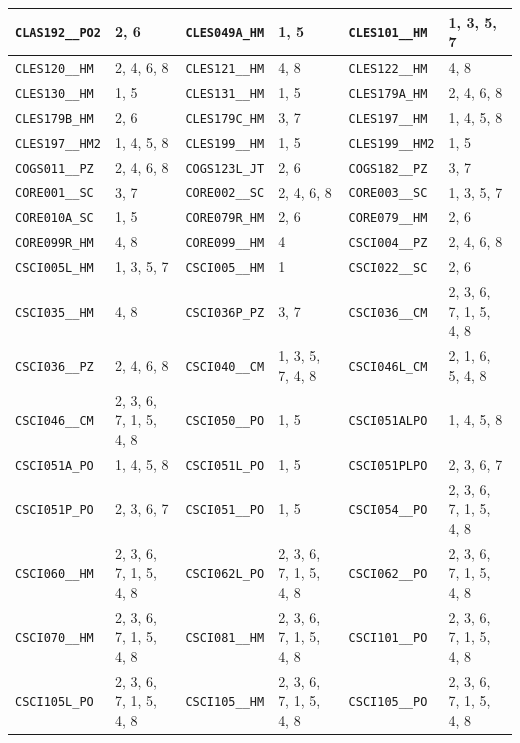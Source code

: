\begin{longtable}{|l|l||l|l||l|l|}
    \verb|CLAS192__PO2| & 2, 6 & \verb|CLES049A_HM| & 1, 5 & \verb|CLES101__HM| & 1, 3, 5, 7\\\hline
    \verb|CLES120__HM| & 2, 4, 6, 8 & \verb|CLES121__HM| & 4, 8 & \verb|CLES122__HM| & 4, 8\\\hline
    \verb|CLES130__HM| & 1, 5 & \verb|CLES131__HM| & 1, 5 & \verb|CLES179A_HM| & 2, 4, 6, 8\\\hline
    \verb|CLES179B_HM| & 2, 6 & \verb|CLES179C_HM| & 3, 7 & \verb|CLES197__HM| & 1, 4, 5, 8\\\hline
    \verb|CLES197__HM2| & 1, 4, 5, 8 & \verb|CLES199__HM| & 1, 5 & \verb|CLES199__HM2| & 1, 5\\\hline
    \verb|COGS011__PZ| & 2, 4, 6, 8 & \verb|COGS123L_JT| & 2, 6 & \verb|COGS182__PZ| & 3, 7\\\hline
    \verb|CORE001__SC| & 3, 7 & \verb|CORE002__SC| & 2, 4, 6, 8 & \verb|CORE003__SC| & 1, 3, 5, 7\\\hline
    \verb|CORE010A_SC| & 1, 5 & \verb|CORE079R_HM| & 2, 6 & \verb|CORE079__HM| & 2, 6\\\hline
    \verb|CORE099R_HM| & 4, 8 & \verb|CORE099__HM| & 4 & \verb|CSCI004__PZ| & 2, 4, 6, 8\\\hline
    \verb|CSCI005L_HM| & 1, 3, 5, 7 & \verb|CSCI005__HM| & 1 & \verb|CSCI022__SC| & 2, 6\\\hline
    \verb|CSCI035__HM| & 4, 8 & \verb|CSCI036P_PZ| & 3, 7 & \verb|CSCI036__CM| & 2, 3, 6, 7, 1, 5, 4, 8\\\hline
    \verb|CSCI036__PZ| & 2, 4, 6, 8 & \verb|CSCI040__CM| & 1, 3, 5, 7, 4, 8 & \verb|CSCI046L_CM| & 2, 1, 6, 5, 4, 8\\\hline
    \verb|CSCI046__CM| & 2, 3, 6, 7, 1, 5, 4, 8 & \verb|CSCI050__PO| & 1, 5 & \verb|CSCI051ALPO| & 1, 4, 5, 8\\\hline
    \verb|CSCI051A_PO| & 1, 4, 5, 8 & \verb|CSCI051L_PO| & 1, 5 & \verb|CSCI051PLPO| & 2, 3, 6, 7\\\hline
    \verb|CSCI051P_PO| & 2, 3, 6, 7 & \verb|CSCI051__PO| & 1, 5 & \verb|CSCI054__PO| & 2, 3, 6, 7, 1, 5, 4, 8\\\hline
    \verb|CSCI060__HM| & 2, 3, 6, 7, 1, 5, 4, 8 & \verb|CSCI062L_PO| & 2, 3, 6, 7, 1, 5, 4, 8 & \verb|CSCI062__PO| & 2, 3, 6, 7, 1, 5, 4, 8\\\hline
    \verb|CSCI070__HM| & 2, 3, 6, 7, 1, 5, 4, 8 & \verb|CSCI081__HM| & 2, 3, 6, 7, 1, 5, 4, 8 & \verb|CSCI101__PO| & 2, 3, 6, 7, 1, 5, 4, 8\\\hline
    \verb|CSCI105L_PO| & 2, 3, 6, 7, 1, 5, 4, 8 & \verb|CSCI105__HM| & 2, 3, 6, 7, 1, 5, 4, 8 & \verb|CSCI105__PO| & 2, 3, 6, 7, 1, 5, 4, 8\\\hline

\end{longtable}
